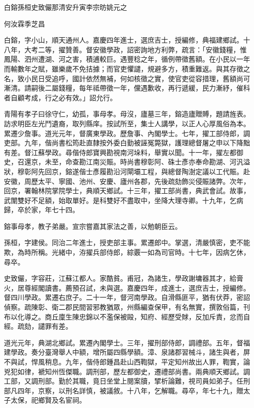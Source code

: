 
\begin{pinyinscope}
白鎔孫桓史致儼那清安升寅李宗昉姚元之

何汝霖季芝昌

白鎔，字小山，順天通州人。嘉慶四年進士，選庶吉士，授編修，典福建鄉試。十八年，大考二等，擢贊善。督安徽學政，詔密詢地方利弊，疏言：「安徽錢糧，惟鳳陽、泗州遭湖、河之害，積逋較巨。遇豐稔之年，循例帶徵舊額。在小民以一年而輸數年之賦，雖樂歲不免拮據；而官吏懼譴，規避多方，積重難返。與其存徵之名，致小民日受追呼，國計依然無補，何如核徵之實，使官吏從容措理，舊額尚可漸清。請嗣後二屬錢糧，每年祗帶徵一年，儻遇歉收，再行遞緩，民力漸紓，催科者自顧考成，行之必有效。」詔允行。

青陽有孝子曰徐守仁，幼孤，事母孝。母沒，廬墓三年，鎔造廬贈賻，題請旌表。訪求明臣左光鬥遺裔，取列縣庠。按試所至，集士人講學，以正人心厚風俗為本。累遷少詹事。道光元年，督廣東學政。歷詹事、內閣學士。七年，擢工部侍郎，調吏部。九年，偕尚書松筠赴直隸按外委白勤被誣冤斃獄，護理總督屠之申以下降黜有差。督江蘇學政。尋偕侍郎寶興勘視南河垛料，舉實以聞。十一年，擢左都御史，召還京，未至，命查勘江南災賑。時尚書穆彰阿、硃士彥亦奉命勘湖、河汎溢狀，穆彰阿先回京，鎔遂偕士彥履勘沿河閘壩工程，與總督陶澍定議以工代賑。赴安徽，周歷太平、寧國、池州、安慶、廬州各郡，先後疏劾飾災侵賑諸弊。次年，回京，署翰林院掌院學士，典順天鄉試。十三年，擢工部尚書，典武會試。故事，武闈雙好不足額，始取單好。是科雙好不盡取中，坐降大理寺卿。十九年，乞病歸，卒於家，年七十四。

鎔事母孝，教子弟嚴。宣宗嘗嘉其家法之善，以勉朝臣云。

孫桓，字建侯。同治二年進士，授吏部主事。累遷郎中。掌選，清嚴慎密，吏不能欺，為時所稱。光緒中，洊擢兵部侍郎，綜覈一如為司官時。十七年，因病乞休，尋卒。

史致儼，字容莊，江蘇江都人。家酷貧。甫冠，為諸生，學政謝墉器其才，給膏火，居尊經閣讀書。薦預召試，未與選。嘉慶四年，成進士，選庶吉士，授編修。督四川學政。累遷右庶子。二十一年，督河南學政。自滑縣匪平，猶有伏莽，密詔偵察。疏陳彰、衛二郡民間習邪教猶眾，州縣編查保甲，有名無實，撰敦俗篇，刊布以化導之。商丘廩生陳忠錦以不濫保被毆，知府、經歷受賕，反加斥責，忿而自經。疏劾，譴罪有差。

道光元年，典湖北鄉試。累遷內閣學士。三年，擢刑部侍郎，調禮部。五年，督福建學政。奏分臺灣舉人中額，增所屬四縣學額。漳、泉諸郡習械斗，諸生與者，屏不與試，悍風稍息。九年，偕侍郎鍾昌赴山西鞫獄，平定知州故出人罪，鞫實，論兇犯如律，褫知州恆傑職。調刑部，歷左都御史，遷禮部尚書。兩典順天鄉試。調工部，又調刑部。勤於其職，竟日坐堂上閱案牘，揅析論難，視司員如弟子。任刑部凡四年，京察，以刑名詳慎，被議敘。十八年，乞解職。尋卒，年七十九，贈太子太保，祀鄉賢及名宦祠。


\end{pinyinscope}
